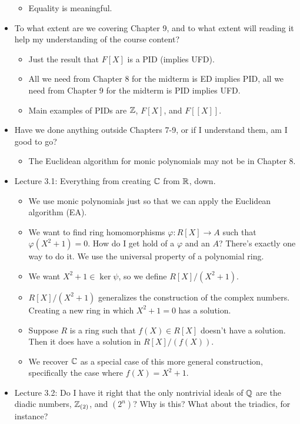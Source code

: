 \documentclass[../notes.tex]{subfiles}
\begin{document}
\begin{itemize}
\begin{itemize}
        \item Equality is meaningful.
    \end{itemize}
    \item To what extent are we covering Chapter 9, and to what extent will reading it help my understanding of the course content?
    \begin{itemize}
        \item Just the result that $F[X]$ is a PID (implies UFD).
        \item All we need from Chapter 8 for the midterm is ED implies PID, all we need from Chapter 9 for the midterm is PID implies UFD.
        \item Main examples of PIDs are $\mathbb{Z}$, $F[X]$, and $F[[X]]$.
    \end{itemize}
    \item Have we done anything outside Chapters 7-9, or if I understand them, am I good to go?
    \begin{itemize}
        \item The Euclidean algorithm for monic polynomials may not be in Chapter 8.
    \end{itemize}
    \item Lecture 3.1: Everything from creating $\mathbb{C}$ from $\mathbb{R}$, down.
    \begin{itemize}
        \item We use monic polynomials just so that we can apply the Euclidean algorithm (EA).
        \item We want to find ring homomorphisms $\varphi:R[X]\to A$ such that $\varphi(X^2+1)=0$. How do I get hold of a $\varphi$ and an $A$? There's exactly one way to do it. We use the universal property of a polynomial ring.
        \item We want $X^2+1\in\ker\psi$, so we define $R[X]/(X^2+1)$.
        \item $R[X]/(X^2+1)$ generalizes the construction of the complex numbers. Creating a new ring in which $X^2+1=0$ has a solution.
        \item Suppose $R$ is a ring such that $f(X)\in R[X]$ doesn't have a solution. Then it does have a solution in $R[X]/(f(X))$.
        \item We recover $\mathbb{C}$ as a special case of this more general construction, specifically the case where $f(X)=X^2+1$.
    \end{itemize}
    \item Lecture 3.2: Do I have it right that the only nontrivial ideals of $\mathbb{Q}$ are the diadic numbers, $\mathbb{Z}_{(2)}$, and $(2^n)$? Why is this? What about the triadics, for instance?

\end{itemize}
\end{document}
